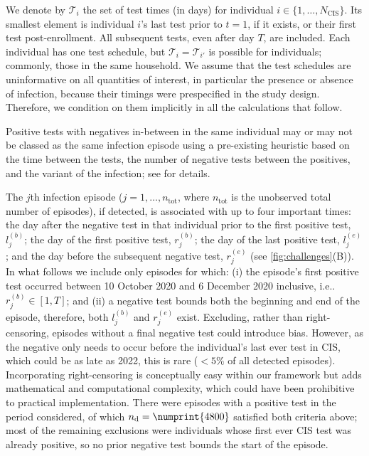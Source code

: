 \documentclass[referee,useAMS,usenatbib]{biom}
\makeatletter
\newcommand{\ntot}{n_\text{tot}}
\newcommand{\ndet}{n_\text{d}}
\newcommand{\Ncis}{N_\text{CIS}}
\newcommand{\sched}{\mathcal{T}}
\DeclareRobustCommand\onedot{\futurelet\@let@token\@onedot}
\def\@onedot{\ifx\@let@token.\else.\null\fi\xspace}
\def\ie{i.e\onedot} \def\Ie{{I.e}\onedot}
\makeatother
\begin{document}
We denote by $\sched_i$ the set of test times (in days) for individual $i \in \{ 1, \dots, \Ncis \}$.
Its smallest element is individual $i$'s last test prior to $t=1$, if it exists, or their first test post-enrollment. All subsequent tests, even after day $T$, are included.
Each individual has one test schedule, but $\sched_i = \sched_{i'}$ is possible for individuals; commonly, those in the same household.
We assume that the test schedules are uninformative on all quantities of interest, in particular the presence or absence of infection, because their timings were prespecified in the study design.
Therefore, we condition on them implicitly in all the calculations that follow.


Positive tests with negatives in-between in the same individual may or may not be classed as the same infection episode using a pre-existing heuristic based on the time between the tests, the number of negative tests between the positives, and the variant of the infection; see \citet{weiRisk} for details.

The $j$th infection episode ($j = 1, \dots, \ntot$, where $\ntot$ is the unobserved total number of episodes), if detected, is associated with up to four important times: the day after the negative test in that individual prior to the first positive test, $l_j^{(b)}$; the day of the first positive test, $r_j^{(b)}$; the day of the last positive test, $l_j^{(e)}$; and the day before the subsequent negative test, $r_j^{(e)}$ (see \cref{fig:challenges}(B)).
In what follows we include only episodes for which: (i) the episode's first positive test occurred between 10 October 2020 and 6 December 2020 inclusive, \ie $r_j^{(b)} \in [1, T]$; and (ii) a negative test bounds both the beginning and end of the episode, therefore, both $l_j^{(b)}$ and $r_j^{(e)}$ exist.
Excluding, rather than right-censoring, episodes without a final negative test  could introduce bias.
However, as the negative only needs to occur before the individual's last ever test in CIS, which could be as late as 2022, this is rare ($<5\%$ of all detected episodes).
Incorporating right-censoring is conceptually easy within our framework but adds mathematical and computational complexity, which could have been prohibitive to practical implementation.
There were  episodes with a positive test in the period considered, of which $\ndet = \numprint{4800}$ satisfied both criteria above; most of the remaining exclusions were individuals whose first ever CIS test was already positive, so no prior negative test bounds the start of the episode.
\end{document}
